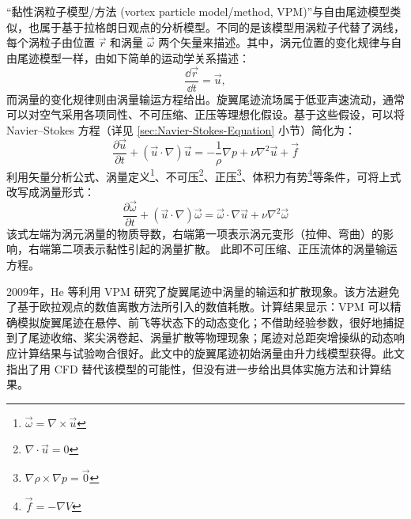 “黏性涡粒子模型/方法 (vortex particle model/method, VPM)”与自由尾迹模型类似，也属于基于拉格朗日观点的分析模型。不同的是该模型用涡粒子代替了涡线，每个涡粒子由位置
$\vec{r}$ 和涡量 $\vec{\omega}$ 两个矢量来描述。其中，涡元位置的变化规律与自由尾迹模型一样，由如下简单的运动学关系描述：
\begin{equation}
\frac{\dd\vec{r}}{\dd t}=\vec{u},
\end{equation}
而涡量的变化规律则由涡量输运方程给出。旋翼尾迹流场属于低亚声速流动，通常可以对空气采用各项同性、不可压缩、正压等理想化假设。基于这些假设，可以将
Navier–Stokes 方程（详见 \ref{sec:Navier-Stokes-Equation} 小节）简化为： 
\begin{equation}
\frac{\partial\vec{u}}{\partial t}+\left(\vec{u}\cdot\nabla\right)\vec{u}=-\frac{1}{\rho}\nabla p+\nu\nabla^{2}\vec{u}+\vec{f}
\end{equation}
利用矢量分析公式、涡量定义\footnote{$\vec{\omega}=\nabla\times\vec{u}$}、不可压\footnote{$\nabla\cdot\vec{u}=0$}、正压\footnote{$\nabla\rho\times\nabla p=\vec{0}$}、体积力有势\footnote{$\vec{f}=-\nabla V$}等条件，可将上式改写成涡量形式：
\begin{equation}
\frac{\partial\vec{\omega}}{\partial t}+\left(\vec{u}\cdot\nabla\right)\vec{\omega}=\vec{\omega}\cdot\nabla\vec{u}+\nu\nabla^{2}\vec{\omega}\label{Vorticity-Transport-Equation}
\end{equation}
该式左端为涡元涡量的物质导数，右端第一项表示涡元变形（拉伸、弯曲）的影响，右端第二项表示黏性引起的涡量扩散。 此即不可压缩、正压流体的涡量输运方程。

2009年，He 等利用 VPM 研究了旋翼尾迹中涡量的输运和扩散现象。该方法避免了基于欧拉观点的数值离散方法所引入的数值耗散。计算结果显示：VPM
可以精确模拟旋翼尾迹在悬停、前飞等状态下的动态变化；不借助经验参数，很好地捕捉到了尾迹收缩、桨尖涡卷起、涡量扩散等物理现象；尾迹对总距突增操纵的动态响应计算结果与试验吻合很好。此文中的旋翼尾迹初始涡量由升力线模型获得。此文指出了用
CFD 替代该模型的可能性，但没有进一步给出具体实施方法和计算结果。

